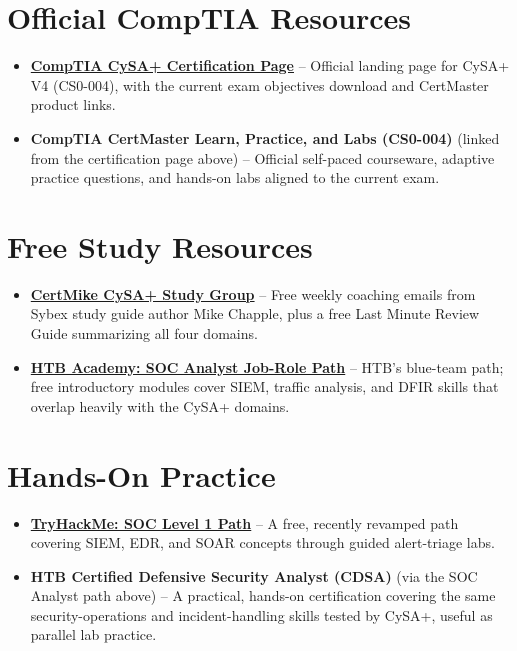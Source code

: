 \documentclass[11pt,letterpaper]{article}
\begin{document}
\section{Official CompTIA Resources}
\begin{itemize}
\item \textbf{\href{https://www.comptia.org/en-us/certifications/cybersecurity-analyst/}{CompTIA CySA+ Certification Page}} -- Official landing page for CySA+ V4 (CS0-004), with the current exam objectives download and CertMaster product links.
\item \textbf{CompTIA CertMaster Learn, Practice, and Labs (CS0-004)} (linked from the certification page above) -- Official self-paced courseware, adaptive practice questions, and hands-on labs aligned to the current exam.
\end{itemize}

\section{Free Study Resources}
\begin{itemize}
\item \textbf{\href{https://certmike.com/csaplus/}{CertMike CySA+ Study Group}} -- Free weekly coaching emails from Sybex study guide author Mike Chapple, plus a free Last Minute Review Guide summarizing all four domains.
\item \textbf{\href{https://academy.hackthebox.com/path/preview/soc-analyst}{HTB Academy: SOC Analyst Job-Role Path}} -- HTB's blue-team path; free introductory modules cover SIEM, traffic analysis, and DFIR skills that overlap heavily with the CySA+ domains.
\end{itemize}

\section{Hands-On Practice}
\begin{itemize}
\item \textbf{\href{https://tryhackme.com/path/outline/soclevel1}{TryHackMe: SOC Level 1 Path}} -- A free, recently revamped path covering SIEM, EDR, and SOAR concepts through guided alert-triage labs.
\item \textbf{HTB Certified Defensive Security Analyst (CDSA)} (via the SOC Analyst path above) -- A practical, hands-on certification covering the same security-operations and incident-handling skills tested by CySA+, useful as parallel lab practice.
\end{itemize}
\end{document}

